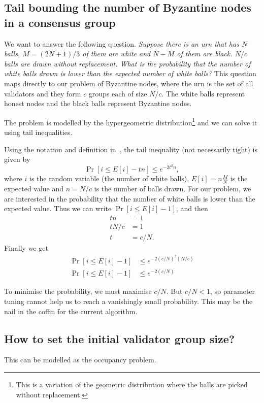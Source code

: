 \subsection{Tail bounding the number of Byzantine nodes in a consensus group}
We want to answer the following question. \emph{Suppose there is an urn that has
  $N$ balls, $M = (2N+1)/3$ of them are white and $N - M$ of them are black.
  $N/c$ balls are drawn without replacement. What is the probability that the
  number of white balls drawn is lower than the expected number of white balls?}
This question maps directly to our problem of Byzantine nodes, where the urn is
the set of all validators and they form $c$ groups each of size $N/c$. The white
balls represent honest nodes and the black balls represent Byzantine nodes.

The problem is modelled by the hypergeometric distribution\footnote{This is a
  variation of the geometric distribution where the balls are picked without
  replacement.} and we can solve it using tail inequalities.

Using the notation and definition in~\cite{skala2013hypergeometric}, the tail
inequality (not necessarily tight) is given by
\[
\Pr[ i \le E[i] - tn ] \le e^{-2t^2n},
\]
where $i$ is the random variable (the number of white balls), $E[i] = n
\frac{M}{N}$ is the expected value and $n = N/c$ is the number of balls drawn.
For our problem, we are interested in the probability that the number of white
balls is lower than the expected value. Thus we can write $\Pr[i \le E[i] - 1]$,
and then
\begin{align*}
  tn &= 1 \\
  tN/c &= 1 \\
  t &= c/N.
\end{align*}
Finally we get
\begin{align*}
  \Pr[ i \le E[i] - 1] &\le e^{-2 (c/N)^2 (N/c)} \\
  \Pr[ i \le E[i] - 1] &\le e^{-2 (c/N)}
\end{align*}

To minimise the probability, we must maximise $c/N$. But $c/N < 1$, so parameter
tuning cannot help us to reach a vanishingly small probability. This may be the
nail in the coffin for the current algorithm.


\subsection{How to set the initial validator group size?}
This can be modelled as the occupancy problem.

